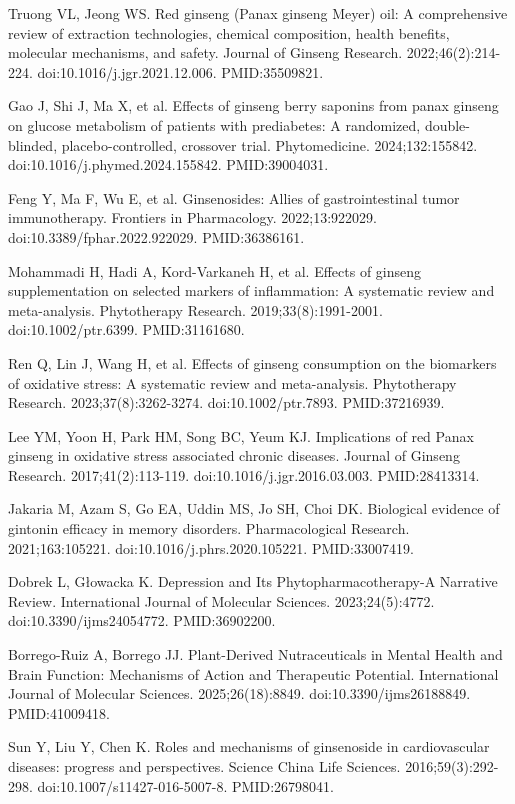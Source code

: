 \documentclass[12pt,oneside]{book}
\newcommand{\reff}[2]{\par\hangindent=7mm\hangafter=1\noindent[#1]\hspace{2mm}#2\par}
\begin{document}
\reff{61}{Truong VL, Jeong WS. Red ginseng (Panax ginseng Meyer) oil: A comprehensive review of extraction technologies, chemical composition, health benefits, molecular mechanisms, and safety. Journal of Ginseng Research. 2022;46(2):214-224. doi:10.1016/j.jgr.2021.12.006. PMID:35509821.}

\reff{62}{Gao J, Shi J, Ma X, et al. Effects of ginseng berry saponins from panax ginseng on glucose metabolism of patients with prediabetes: A randomized, double-blinded, placebo-controlled, crossover trial. Phytomedicine. 2024;132:155842. doi:10.1016/j.phymed.2024.155842. PMID:39004031.}

\reff{63}{Feng Y, Ma F, Wu E, et al. Ginsenosides: Allies of gastrointestinal tumor immunotherapy. Frontiers in Pharmacology. 2022;13:922029. doi:10.3389/fphar.2022.922029. PMID:36386161.}

\reff{64}{Mohammadi H, Hadi A, Kord-Varkaneh H, et al. Effects of ginseng supplementation on selected markers of inflammation: A systematic review and meta-analysis. Phytotherapy Research. 2019;33(8):1991-2001. doi:10.1002/ptr.6399. PMID:31161680.}

\reff{65}{Ren Q, Lin J, Wang H, et al. Effects of ginseng consumption on the biomarkers of oxidative stress: A systematic review and meta-analysis. Phytotherapy Research. 2023;37(8):3262-3274. doi:10.1002/ptr.7893. PMID:37216939.}

\reff{66}{Lee YM, Yoon H, Park HM, Song BC, Yeum KJ. Implications of red Panax ginseng in oxidative stress associated chronic diseases. Journal of Ginseng Research. 2017;41(2):113-119. doi:10.1016/j.jgr.2016.03.003. PMID:28413314.}

\reff{67}{Jakaria M, Azam S, Go EA, Uddin MS, Jo SH, Choi DK. Biological evidence of gintonin efficacy in memory disorders. Pharmacological Research. 2021;163:105221. doi:10.1016/j.phrs.2020.105221. PMID:33007419.}

\reff{68}{Dobrek L, Głowacka K. Depression and Its Phytopharmacotherapy-A Narrative Review. International Journal of Molecular Sciences. 2023;24(5):4772. doi:10.3390/ijms24054772. PMID:36902200.}

\reff{69}{Borrego-Ruiz A, Borrego JJ. Plant-Derived Nutraceuticals in Mental Health and Brain Function: Mechanisms of Action and Therapeutic Potential. International Journal of Molecular Sciences. 2025;26(18):8849. doi:10.3390/ijms26188849. PMID:41009418.}

\reff{70}{Sun Y, Liu Y, Chen K. Roles and mechanisms of ginsenoside in cardiovascular diseases: progress and perspectives. Science China Life Sciences. 2016;59(3):292-298. doi:10.1007/s11427-016-5007-8. PMID:26798041.}
\end{document}
